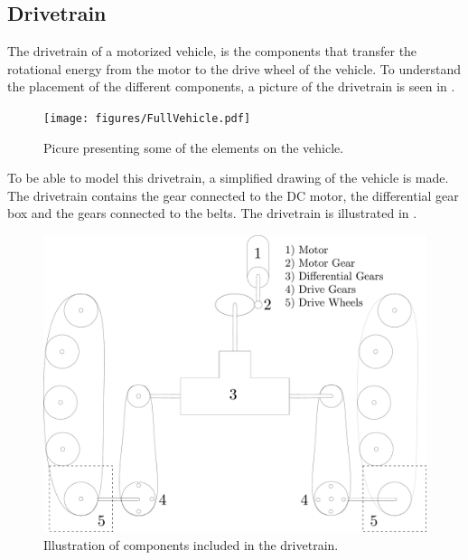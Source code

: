 \subsection{Drivetrain}
The drivetrain of a motorized vehicle, is the components that transfer the rotational energy from the motor to the drive wheel of the vehicle. To understand the placement of the different components, a picture of the drivetrain is seen in . 

\begin{figure}[H]
	\centering
	\texttt{[image: figures/FullVehicle.pdf]}
	\caption{Picure presenting some of the elements on the vehicle.}
	\label{FullVehicle}
\end{figure}

To be able to model this drivetrain, a simplified drawing of the vehicle is made. The drivetrain contains the gear connected to the DC motor, the differential gear box and the gears connected to the belts. The drivetrain is illustrated in .

\begin{figure}[H]
	\centering
	\includegraphics[scale=.25]{figures/vehicleDescriptionDriveTrain.pdf}
	\caption{Illustration of components included in the drivetrain.}
	\label{vehicleDescriptionDriveTrain}
\end{figure}

